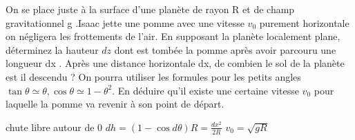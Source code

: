 \begin{Exercise}[title=La pomme]
	On se place juste à la surface d'une planète de rayon R et de champ gravitationnel g .Isaac jette  une	pomme avec une vitesse $v_0$ purement horizontale	on négligera les frottements de l'air.
	\Question En supposant la planète localement plane, déterminez la hauteur $dz$ dont est tombée la	pomme après avoir parcouru une longueur dx .
	\Question Après une distance horizontale dx, de combien le sol de la planète est il descendu ? On
	pourra utiliser les formules pour les petits
	angles $\tan \theta\simeq \theta , \cos \theta \simeq  1-\theta^2$.
	\Question En déduire qu'il existe une certaine vitesse $v_0$
	pour laquelle la pomme va revenir à son point
	de départ.
\end{Exercise}
\begin{Answer}
\Question chute libre autour de 0
\Question $dh=(1-\cos d\theta)R=\frac{dx^2}{2R}$
\Question $v_0=\sqrt{gR}$
\end{Answer}
